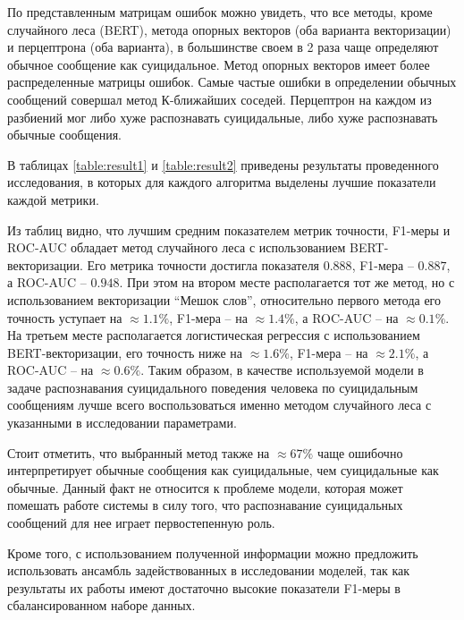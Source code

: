 По представленным матрицам ошибок можно увидеть, что все методы, кроме случайного леса (BERT), метода опорных векторов (оба варианта векторизации) и перцептрона (оба варианта), в большинстве своем в 2 раза чаще определяют обычное сообщение как суицидальное. Метод опорных векторов имеет более распределенные матрицы ошибок. Самые частые ошибки в определении обычных сообщений совершал метод К-ближайших соседей. Перцептрон на каждом из разбиений мог либо хуже распознавать суицидальные, либо хуже распознавать обычные сообщения.

В таблицах \ref{table:result1} и \ref{table:result2} приведены результаты проведенного исследования, в которых для каждого алгоритма выделены лучшие показатели каждой метрики.

Из таблиц видно, что лучшим средним показателем метрик точности, F1-меры и ROC-AUC обладает метод случайного леса с использованием BERT-векторизации.
Его метрика точности достигла показателя $0.888$, F1-мера -- $0.887$, а ROC-AUC -- $0.948$.
При этом на втором месте располагается тот же метод, но с использованием векторизации ``Мешок слов'', относительно первого метода его точность уступает на $\approx 1.1\%$, F1-мера -- на $\approx 1.4\%$, а ROC-AUC -- на $\approx 0.1\%$. На третьем месте располагается логистическая регрессия с использованием BERT-векторизации, его точность ниже на $\approx 1.6\%$, F1-мера -- на $\approx 2.1\%$, а ROC-AUC -- на $\approx 0.6\%$. 
Таким образом, в качестве используемой модели в задаче распознавания суицидального поведения человека по суицидальным сообщениям лучше всего воспользоваться именно методом случайного леса с указанными в исследовании параметрами.

Стоит отметить, что выбранный метод также на $\approx 67\%$ чаще ошибочно интерпретирует обычные сообщения как суицидальные, чем суицидальные как обычные. Данный факт не относится к проблеме модели, которая может помешать работе системы в силу того, что распознавание суицидальных сообщений для нее играет первостепенную роль.

Кроме того, с использованием полученной информации можно предложить использовать ансамбль задействованных в исследовании моделей, так как результаты их работы имеют достаточно высокие показатели F1-меры в сбалансированном наборе данных.

